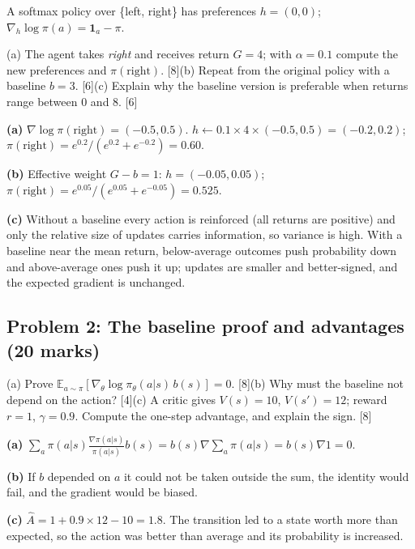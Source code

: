 \documentclass[11pt]{article}
\begin{document}
\begin{prob}A softmax policy over \{left, right\} has preferences $h=(0,0)$; $\nabla_h\log\pi(a)=\mathbf 1_a-\pi$.

(a) The agent takes \textit{right} and receives return $G=4$; with $\alpha=0.1$ compute the new preferences and $\pi(\text{right})$. [8]\newline (b) Repeat from the original policy with a baseline $b=3$. [6]\newline (c) Explain why the baseline version is preferable when returns range between 0 and 8. [6]\end{prob}

\begin{soln}\textbf{(a)} $\nabla\log\pi(\text{right})=(-0.5,0.5)$. $h\leftarrow0.1\times4\times(-0.5,0.5)=(-0.2,0.2)$; $\pi(\text{right})=e^{0.2}/(e^{0.2}+e^{-0.2})=\mathbf{0.60}$.

\textbf{(b)} Effective weight $G-b=1$: $h=(-0.05,0.05)$; $\pi(\text{right})=e^{0.05}/(e^{0.05}+e^{-0.05})=\mathbf{0.525}$.

\textbf{(c)} Without a baseline every action is reinforced (all returns are positive) and only the relative size of updates carries information, so variance is high. With a baseline near the mean return, below-average outcomes push probability down and above-average ones push it up; updates are smaller and better-signed, and the expected gradient is unchanged.\end{soln}

\subsection{Problem 2: The baseline proof and advantages \normalfont\small\color{GreyN}(20 marks)}

\begin{prob}(a) Prove $\mathbb E_{a\sim\pi}[\nabla_\theta\log\pi_\theta(a|s)\,b(s)]=0$. [8]\newline (b) Why must the baseline not depend on the action? [4]\newline (c) A critic gives $V(s)=10$, $V(s')=12$; reward $r=1$, $\gamma=0.9$. Compute the one-step advantage, and explain the sign. [8]\end{prob}

\begin{soln}\textbf{(a)} $\sum_a\pi(a|s)\frac{\nabla\pi(a|s)}{\pi(a|s)}b(s)=b(s)\nabla\sum_a\pi(a|s)=b(s)\nabla1=0$.

\textbf{(b)} If $b$ depended on $a$ it could not be taken outside the sum, the identity would fail, and the gradient would be biased.

\textbf{(c)} $\hat A=1+0.9\times12-10=\mathbf{1.8}$. The transition led to a state worth more than expected, so the action was better than average and its probability is increased.\end{soln}
\end{document}
